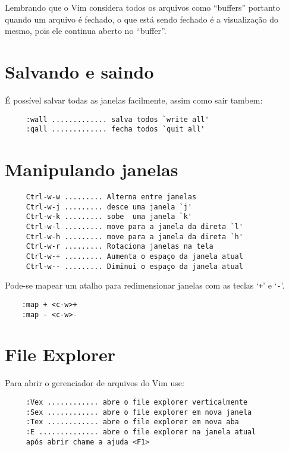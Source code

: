 {\Large {}} Lembrando que o Vim considera todos os arquivos como ``buffers''
portanto quando um arquivo é fechado, o que está sendo fechado é a visualização
do mesmo, pois ele continua aberto no ``buffer''.


\section{Salvando e saindo}
É possível salvar todas as janelas facilmente, assim como sair tambem:

\begin{verbatim}
     :wall ............. salva todos `write all'
     :qall ............. fecha todos `quit all'
\end{verbatim}


\section{Manipulando janelas }

\begin{verbatim}
     Ctrl-w-w ......... Alterna entre janelas
     Ctrl-w-j ......... desce uma janela `j'
     Ctrl-w-k ......... sobe  uma janela `k'
     Ctrl-w-l ......... move para a janela da direta `l'
     Ctrl-w-h ......... move para a janela da direta `h'
     Ctrl-w-r ......... Rotaciona janelas na tela
     Ctrl-w-+ ......... Aumenta o espaço da janela atual
     Ctrl-w-- ......... Diminui o espaço da janela atual
\end{verbatim}

Pode-se mapear um atalho para redimensionar janelas com as teclas `\verb|+|' e `\verb|-|'.

\begin{verbatim}
    :map + <c-w>+
    :map - <c-w>-
\end{verbatim}

\section{File Explorer }
\label{File Explorer }
Para abrir o gerenciador de arquivos do Vim use:

\begin{verbatim}
     :Vex ............ abre o file explorer verticalmente
     :Sex ............ abre o file explorer em nova janela
     :Tex ............ abre o file explorer em nova aba
     :E .............. abre o file explorer na janela atual
     após abrir chame a ajuda <F1>
\end{verbatim}


